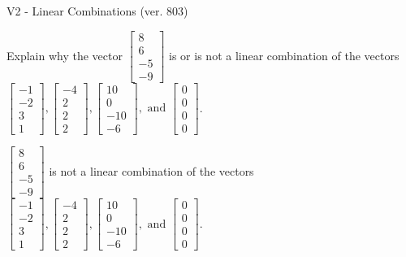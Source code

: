 \begin{exercise}
  \begin{exerciseTitle}V2 - Linear Combinations (ver. 803)\end{exerciseTitle}
  \begin{exerciseStatement}
    Explain why the vector \(\left[\begin{array}{c}
8 \\
6 \\
-5 \\
-9
\end{array}\right]\)  is or is not a linear 
	combination of the vectors \(\left[\begin{array}{c}
-1 \\
-2 \\
3 \\
1
\end{array}\right] , \left[\begin{array}{c}
-4 \\
2 \\
2 \\
2
\end{array}\right] , \left[\begin{array}{c}
10 \\
0 \\
-10 \\
-6
\end{array}\right] , \text{ and } \left[\begin{array}{c}
0 \\
0 \\
0 \\
0
\end{array}\right]\).
	


  \end{exerciseStatement}
  \begin{exerciseAnswer}
   \(\left[\begin{array}{c}
8 \\
6 \\
-5 \\
-9
\end{array}\right]\) 
  	 is not  
	a linear combination of the vectors \(\left[\begin{array}{c}
-1 \\
-2 \\
3 \\
1
\end{array}\right] , \left[\begin{array}{c}
-4 \\
2 \\
2 \\
2
\end{array}\right] , \left[\begin{array}{c}
10 \\
0 \\
-10 \\
-6
\end{array}\right] , \text{ and } \left[\begin{array}{c}
0 \\
0 \\
0 \\
0
\end{array}\right]\).


\end{exerciseAnswer}
\end{exercise}
